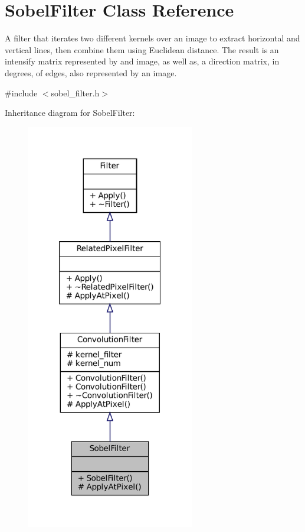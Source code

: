 \hypertarget{classSobelFilter}{}\section{Sobel\+Filter Class Reference}
\label{classSobelFilter}


A filter that iterates two different kernels over an image to extract horizontal and vertical lines, then combine them using Euclidean distance. The result is an intensify matrix represented by and image, as well as, a direction matrix, in degrees, of edges, also represented by an image.  




{\ttfamily \#include $<$sobel\+\_\+filter.\+h$>$}



Inheritance diagram for Sobel\+Filter\+:\nopagebreak
\begin{figure}[H]
\begin{center}
\leavevmode
\includegraphics[width=208pt]{classSobelFilter__inherit__graph}
\end{center}
\end{figure}


